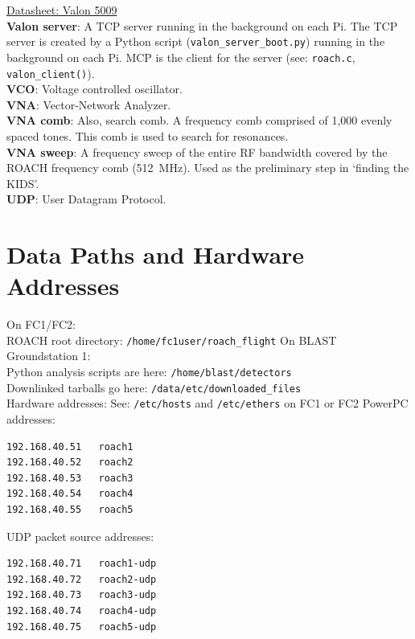 \href{https://www.valonrf.com/uploads/1/1/7/3/117370920/5009_datasheet_v1.34_20181113_ljr.pdf}{Datasheet: Valon 5009}\\
\textbf{Valon server}: A TCP server running in the background on each Pi. The TCP server is created by a Python script (\texttt{valon\_server\_boot.py}) running in the background on each Pi. MCP is the client for the server (see: \texttt{roach.c}, \texttt{valon\_client()}).\\
\textbf{VCO}: Voltage controlled oscillator.\\
\textbf{VNA}: Vector-Network Analyzer.\\
\textbf{VNA comb}: Also, search comb. A frequency comb comprised of 1,000 evenly spaced tones. This comb is used to search for resonances.\\
\textbf{VNA sweep}: A frequency sweep of the entire RF bandwidth covered by the ROACH frequency comb (512~MHz). Used as the preliminary step in `finding the KIDS'.\\
\textbf{UDP}: User Datagram Protocol.

\section{Data Paths and Hardware Addresses}\label{data_paths}
\noindent On FC1/FC2:\\

ROACH root directory: \texttt{/home/fc1user/roach\_flight}\newline\newline
On BLAST Groundstation 1:\\

Python analysis scripts are here: \texttt{/home/blast/detectors}\\

Downlinked tarballs go here: \texttt{/data/etc/downloaded\_files}\\

\noindent Hardware addresses:
See: \texttt{/etc/hosts} and \texttt{/etc/ethers} on FC1 or FC2
PowerPC addresses:

\begin{verbatim}
192.168.40.51	roach1
192.168.40.52	roach2
192.168.40.53	roach3
192.168.40.54	roach4
192.168.40.55	roach5
\end{verbatim}

\noindent UDP packet source addresses:

\begin{verbatim}
192.168.40.71	roach1-udp
192.168.40.72	roach2-udp
192.168.40.73	roach3-udp
192.168.40.74	roach4-udp
192.168.40.75	roach5-udp
\end{verbatim}

